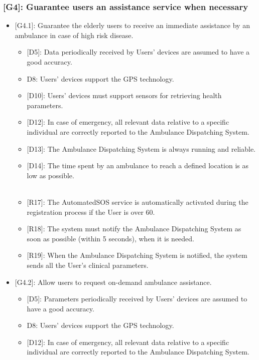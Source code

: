 \documentclass[12pt,a4paper]{article}
\begin{document}
	\subsubsection*{{[}{G4}{]}: Guarantee users an assistance service when necessary}
		\begin{itemize}
			\item {[G4.1]}: Guarantee the elderly users to receive an immediate assistance by an ambulance in case of high risk disease.
			\begin{itemize}
				\item {[D5]}: Data periodically received by Users' devices are assumed to have a good accuracy.
				\item {D8}: Users' devices support the GPS technology.
				\item {[D10]}: Users' devices must support sensors for retrieving health parameters.
				\item {[D12]}: In case of emergency, all relevant data relative to a specific individual are correctly reported to the Ambulance Dispatching System.
				\item {[D13]}: The Ambulance Dispatching System is always running and reliable.
				\item {[D14]}: The time spent by an ambulance to reach a defined location is as low as possible.
				\\ \\
				\item {[R17]}: The AutomatedSOS service is automatically activated during the registration process if the User is over 60.
				\item {[R18]}: The system must notify the Ambulance Dispatching System as soon as possible (within 5 seconds), when it is needed.
				\item {[R19]}: When the Ambulance Dispatching System is notified, the system sends all the User's clinical parameters.
			\end{itemize}
			\item {[G4.2]}: Allow users to request on-demand ambulance assistance.
			\begin{itemize}
				\item {[D5]}: Parameters periodically received by Users' devices are assumed to have a good accuracy.
				\item {D8}: Users' devices support the GPS technology.
				\item {[D12]}: In case of emergency, all relevant data relative to a specific individual are correctly reported to the Ambulance Dispatching System.

\end{itemize}
\end{itemize}
\end{document}
